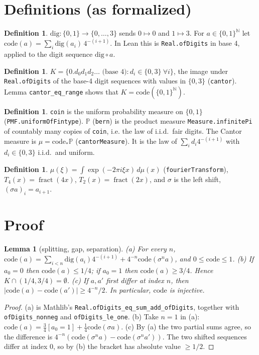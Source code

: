 \documentclass[11pt]{article}
\newtheorem{lemma}[theorem]{Lemma}
\theoremstyle{definition}
\newtheorem{definition}[theorem]{Definition}
\newcommand{\fr}{\operatorname{fract}}
\begin{document}
\section{Definitions (as formalized)}

\begin{definition}
$\mathrm{dig}:\{0,1\}\to\{0,\dots,3\}$ sends $0\mapsto 0$ and $1\mapsto 3$. For
$a\in\{0,1\}^{\mathbb{N}}$ let $\mathrm{code}(a)=\sum_i \mathrm{dig}(a_i)\,4^{-(i+1)}$. In Lean this
is \texttt{Real.ofDigits} in base 4, applied to the digit sequence $\mathrm{dig}\circ a$.
\end{definition}

\begin{definition}
$K=\{0.d_0d_1d_2\ldots \text{ (base 4)} : d_i\in\{0,3\}\ \forall i\}$, the image under
\texttt{Real.ofDigits} of the base-4 digit sequences with values in $\{0,3\}$ (\texttt{cantor}).
Lemma \texttt{cantor\_eq\_range} shows that $K=\mathrm{code}(\{0,1\}^{\mathbb{N}})$.
\end{definition}

\begin{definition}
\texttt{coin} is the uniform probability measure on $\{0,1\}$ (\texttt{PMF.uniformOfFintype}).
$\mathbb{P}$ (\texttt{bern}) is the product measure \texttt{Measure.infinitePi} of countably many
copies of \texttt{coin}, i.e. the law of i.i.d.\ fair digits. The Cantor measure is
$\mu=\mathrm{code}_*\mathbb{P}$ (\texttt{cantorMeasure}). It is the law of
$\sum_i d_i4^{-(i+1)}$ with $d_i\in\{0,3\}$ i.i.d.\ and uniform.
\end{definition}

\begin{definition}
$\hat\mu(\xi)=\int\exp(-2\pi i\xi x)\,d\mu(x)$ (\texttt{fourierTransform}), $T_4(x)=\fr(4x)$,
$T_2(x)=\fr(2x)$, and $\sigma$ is the left shift, $(\sigma a)_i=a_{i+1}$.
\end{definition}

\section{Proof}

\begin{lemma}[splitting, gap, separation]\label{l:split}
(a) For every $n$, $\mathrm{code}(a)=\sum_{i<n}\mathrm{dig}(a_i)4^{-(i+1)}+4^{-n}\mathrm{code}(\sigma^n a)$,
and $0\le\mathrm{code}\le1$.
(b) If $a_0=0$ then $\mathrm{code}(a)\le 1/4$; if $a_0=1$ then $\mathrm{code}(a)\ge3/4$. Hence
$K\cap(1/4,3/4)=\emptyset$.
(c) If $a,a'$ first differ at index $n$, then $|\mathrm{code}(a)-\mathrm{code}(a')|\ge 4^{-n}/2$. In
particular, $\mathrm{code}$ is injective.
\end{lemma}
\begin{proof}
(a) is Mathlib's \texttt{Real.ofDigits\_eq\_sum\_add\_ofDigits}, together with
\texttt{ofDigits\_nonneg} and \texttt{ofDigits\_le\_one}. (b) Take $n=1$ in (a):
$\mathrm{code}(a)=\tfrac34[a_0=1]+\tfrac14\mathrm{code}(\sigma a)$. (c) By (a) the two partial sums
agree, so the difference is $4^{-n}(\mathrm{code}(\sigma^n a)-\mathrm{code}(\sigma^n a'))$. The two
shifted sequences differ at index $0$, so by (b) the bracket has absolute value $\ge1/2$.
\end{proof}
\end{document}
